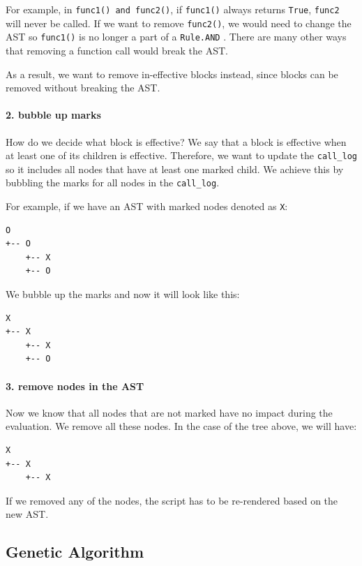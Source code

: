 \documentclass[]{article}
\let\oldparagraph\paragraph
\renewcommand{\paragraph}[1]{\oldparagraph{#1}\mbox{}}
\begin{document}
For example, in \texttt{func1()\ and\ func2()}, if \texttt{func1()}
always returns \texttt{True}, \texttt{func2} will never be called. If we
want to remove \texttt{func2()}, we would need to change the AST so
\texttt{func1()} is no longer a part of a \texttt{Rule.AND} . There are
many other ways that removing a function call would break the AST.

As a result, we want to remove in-effective blocks instead, since blocks
can be removed without breaking the AST.

\paragraph{2. bubble up marks}\label{bubble-up-marks}

How do we decide what block is effective? We say that a block is
effective when at least one of its children is effective. Therefore, we
want to update the \texttt{call\_log} so it includes all nodes that have
at least one marked child. We achieve this by bubbling the marks for all
nodes in the \texttt{call\_log}.

For example, if we have an AST with marked nodes denoted as \texttt{X}:

\begin{verbatim}
O
+-- O
    +-- X
    +-- O
\end{verbatim}

We bubble up the marks and now it will look like this:

\begin{verbatim}
X
+-- X
    +-- X
    +-- O
\end{verbatim}

\paragraph{3. remove nodes in the AST}\label{remove-nodes-in-the-ast}

Now we know that all nodes that are not marked have no impact during the
evaluation. We remove all these nodes. In the case of the tree above, we
will have:

\begin{verbatim}
X
+-- X
    +-- X
\end{verbatim}

If we removed any of the nodes, the script has to be re-rendered based
on the new AST.

\subsection{Genetic Algorithm}\label{genetic-algorithm}
\end{document}
